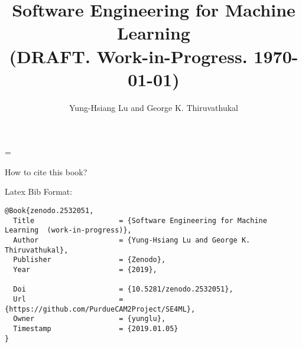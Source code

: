 

\begin{comment}

to find all files that contain a term (useful for creating index)

grep -r term * | grep tex | sed 's/:/ /g' | awk '{print $1}' | sort | uniq

\end{comment}

\newcommand{\progpath}{\basepath/programs}

\makeatletter
\def\seealso#1#2{{\em see also\/} #1, #2}
\makeatother

\title{Software Engineering for Machine Learning \\
{\Large (DRAFT. Work-in-Progress.  \today)}}
\author{Yung-Hsiang Lu and
George K. Thiruvathukal}

%
%

\emergencystretch=\maxdimen
{}



\begin{comment}
reduce space

titlesec
http://www.ctex.org/documents/packages/layout/titlesec.pdf
wrapfig

\end{comment}

\maketitle

   
\clearpage
\vspace*{\fill}
How to cite this book?

Latex Bib Format: 
\begin{verbatim}
@Book{zenodo.2532051,
  Title                    = {Software Engineering for Machine Learning  (work-in-progress)},
  Author                   = {Yung-Hsiang Lu and George K. Thiruvathukal},
  Publisher                = {Zenodo},
  Year                     = {2019},

  Doi                      = {10.5281/zenodo.2532051},
  Url                      = {https://github.com/PurdueCAM2Project/SE4ML},
  Owner                    = {yunglu},
  Timestamp                = {2019.01.05}
}
\end{verbatim}

